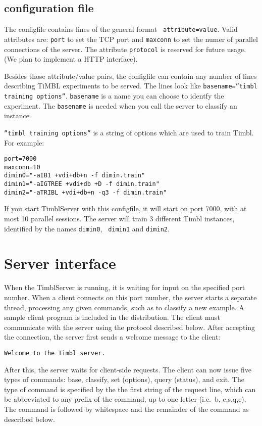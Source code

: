 \documentclass{report}
\begin{document}
\subsection{configuration file}
\label{configfile}
The configfile contains lines of the general format {\tt
  attribute=value}.  Valid attributes are: {\tt port} to set the TCP
port and {\tt maxconn} to set the numer of parallel connections of the
server. The attribute {\tt protocol} is reserved for future usage. (We
plan to implement a HTTP interface).

Besides those attribute/value pairs, the configfile can contain any
number of lines describing TiMBL experiments to be served. The lines
look like {\tt basename=''timbl training options''}.  {\tt basename}
is a name you can choose to identfy the experiment. The {\tt basename}
is needed when you call the server to classify an instance.

{\tt ''timbl training options''} is a string of options which are used
to train Timbl. For example:

\begin{verbatim}
port=7000
maxconn=10
dimin0="-aIB1 +vdi+db+n -f dimin.train"
dimin1="-aIGTREE +vdi+db +D -f dimin.train"
dimin2="-aTRIBL +vdi+db+n -q3 -f dimin.train"
\end{verbatim}

If you start TimblServer with this configfile, it will start on port
7000, with at most 10 parallel sessions. The server will train 3
different Timbl instances, identified by the names {\tt dimin0}, {\tt
  dimin1} and {\tt dimin2}.

\section{Server interface}
\label{serverformat}

When the TimblServer is running, it is waiting for input on the
specified port number. When a client connects on this port number, the
server starts a separate thread, processing any given commands, such
as to classify a new example. A sample client program is included in
the distribution. The client must communicate with the server using
the protocol described below. After accepting the connection, the
server first sends a welcome message to the client:

{\tt Welcome to the Timbl server.}

After this, the server waits for client-side requests.  The client can
now issue five types of commands: base, classify, set (options), query
(status), and exit. The type of command is specified by the the first
string of the request line, which can be abbreviated to any prefix of
the command, up to one letter (i.e.~b, c,s,q,e). The command is
followed by whitespace and the remainder of the command as described
below.
\end{document}
